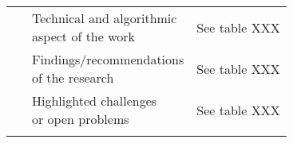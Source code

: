 \begin{landscape}
\begin{longtable}{lp{}p{}}
	\multirow{3}[0]{*}{~\citep{Yan2008}} & 
    \specialcell{Technical and algorithmic \\ aspect of the work} &
    See table XXX 
    \\ & 
    \specialcell{Findings/recommendations \\ of the research} & 
    See table XXX 
    \\ & 
    \specialcell{Highlighted challenges \\ or open problems} & 
    See table XXX 
	\\
	
    \hline
     \label{tab:fpm}
    \end{longtable}%
\end{landscape}